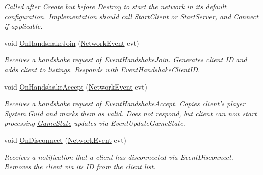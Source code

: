 \begin{DoxyCompactItemize}
\begin{DoxyCompactList}\small\item\em Called after \hyperlink{class_skyrates_1_1_common_1_1_network_1_1_network_common_a575172eb9f965e181e19649bcce38ca0}{Create} but before \hyperlink{class_skyrates_1_1_common_1_1_network_1_1_network_common_aa00266a16aa27dfd0eb242c74856a92a}{Destroy} to start the network in its default configuration. Implementation should call \hyperlink{class_skyrates_1_1_common_1_1_network_1_1_network_common_a982b732d621ff3f8738319053af8d154}{Start\-Client} or \hyperlink{class_skyrates_1_1_common_1_1_network_1_1_network_common_ac1209cf3fc31d2f145678971472ec20c}{Start\-Server}, and \hyperlink{class_skyrates_1_1_common_1_1_network_1_1_network_common_aa11961a4a6dc22c782552eb96e27c6e1}{Connect} if applicable.  \end{DoxyCompactList}\item 
void \hyperlink{class_skyrates_1_1_server_1_1_network_1_1_client_server_a616e25df08abf64f88a13963998946d6}{On\-Handshake\-Join} (\hyperlink{class_skyrates_1_1_common_1_1_network_1_1_event_1_1_network_event}{Network\-Event} evt)
\begin{DoxyCompactList}\small\item\em Receives a handshake request of Event\-Handshake\-Join. Generates client I\-D and adds client to listings. Responds with Event\-Handshake\-Client\-I\-D. \end{DoxyCompactList}\item 
void \hyperlink{class_skyrates_1_1_server_1_1_network_1_1_client_server_a78530cef0b66221a02afb62711ff8fe0}{On\-Handshake\-Accept} (\hyperlink{class_skyrates_1_1_common_1_1_network_1_1_event_1_1_network_event}{Network\-Event} evt)
\begin{DoxyCompactList}\small\item\em Receives a handshake request of Event\-Handshake\-Accept. Copies client's player System.\-Guid and marks them as valid. Does not respond, but client can now start processing \hyperlink{class_game_state}{Game\-State} updates via Event\-Update\-Game\-State. \end{DoxyCompactList}\item 
void \hyperlink{class_skyrates_1_1_server_1_1_network_1_1_client_server_a2c69e29494aa3decead4ed8546ad8c6a}{On\-Disconnect} (\hyperlink{class_skyrates_1_1_common_1_1_network_1_1_event_1_1_network_event}{Network\-Event} evt)
\begin{DoxyCompactList}\small\item\em Receives a notification that a client has disconnected via Event\-Disconnect. Removes the client via its I\-D from the client list. \end{DoxyCompactList}\end{DoxyCompactItemize}
